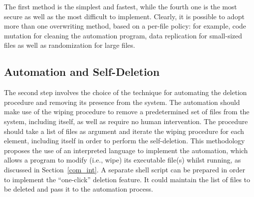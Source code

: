\documentclass[10pt, conference, compsocconf]{IEEEtran}
\begin{document}
\vspace{0.15cm}
The first method is the simplest and fastest, while the fourth one is the most secure as well as the most difficult to implement. Clearly, it is possible to adopt more than one overwriting method, based on a per-file policy: for example, code mutation for cleaning the automation program, data replication for small-sized files as well as randomization for large files.

\subsection{Automation and Self-Deletion}
\label{overw}
The second step involves the choice of the technique for automating the deletion procedure and removing its presence from the system.
The automation should make use of the wiping procedure to remove a predetermined set of files from the system, including itself, as well as require no human intervention. The procedure should take a list of files as argument and iterate the wiping procedure for each element, including itself in order to perform the self-deletion. This methodology proposes the use of an interpreted language to implement the automation, which allows a program to modify (i.e., wipe) its executable file(s) whilst running, as discussed in Section~\ref{com_int}.
A separate shell script can be prepared in order to implement the ``one-click'' deletion feature.
It could maintain the list of files to be deleted and pass it to the automation process.

\end{document}
